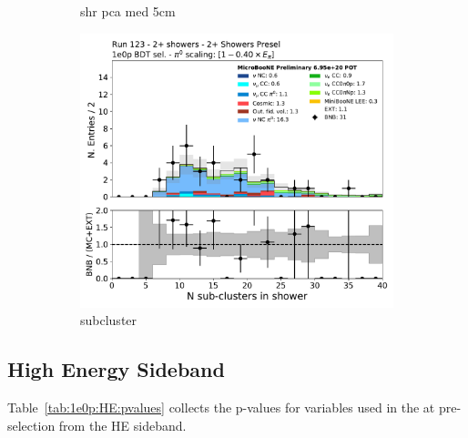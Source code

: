 \begin{figure}[H]
\begin{subfigure}{0.3\textwidth}
    \caption{shr pca med 5cm}
    \end{subfigure}
    \begin{subfigure}{0.3\textwidth}
    \includegraphics[width=1.0\textwidth]{Sidebands/Figures/TwoShr_1e0pSel/BDT/subcluster.pdf}
    \caption{subcluster}
    \end{subfigure}
    \caption{} 
    \label{fig:HE_1eNp_1}
\end{figure}

\subsection{\zpsel High Energy Sideband}


Table~\ref{tab:1e0p:HE:pvalues} collects the p-values for variables used in the \zpsel at pre-selection from the HE sideband.

